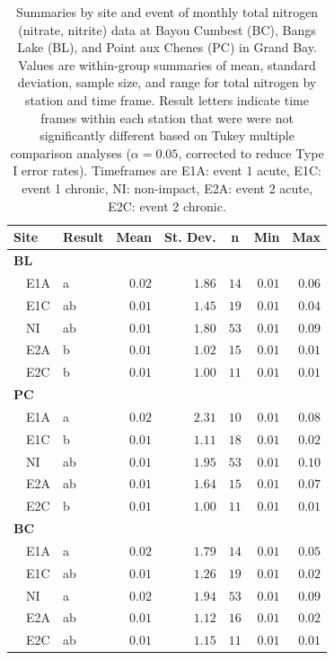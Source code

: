 \documentclass[letterpaper,12pt]{article}\usepackage[]{graphicx}\usepackage[]{color}
\begin{document}
\begin{table}[!tbp]
\caption{Summaries by site and event of monthly total nitrogen (nitrate, nitrite) data at Bayou Cumbest (BC), Bangs Lake (BL), and Point aux Chenes (PC) in Grand Bay.  Values are within-group summaries of mean, standard deviation, sample size, and range for total nitrogen by station and time frame.  Result letters indicate time frames within each station that were were not significantly different based on Tukey multiple comparison analyses ($\alpha = 0.05$, corrected to reduce Type I error rates). Timeframes are E1A: event 1 acute, E1C: event 1 chronic, NI: non-impact, E2A: event 2 acute, E2C: event 2 chronic.\label{tab:tntab}} 
\begin{center}
\begin{tabular}{llrrrrr}
\hline\hline
\multicolumn{1}{l}{Site}&\multicolumn{1}{c}{Result}&\multicolumn{1}{c}{Mean}&\multicolumn{1}{c}{St. Dev.}&\multicolumn{1}{c}{n}&\multicolumn{1}{c}{Min}&\multicolumn{1}{c}{Max}\tabularnewline
\hline
{\bfseries BL}&&&&&&\tabularnewline
~~E1A&a&$0.02$&$1.86$&$14$&$0.01$&$0.06$\tabularnewline
~~E1C&ab&$0.01$&$1.45$&$19$&$0.01$&$0.04$\tabularnewline
~~NI&ab&$0.01$&$1.80$&$53$&$0.01$&$0.09$\tabularnewline
~~E2A&b&$0.01$&$1.02$&$15$&$0.01$&$0.01$\tabularnewline
~~E2C&b&$0.01$&$1.00$&$11$&$0.01$&$0.01$\tabularnewline
\hline
{\bfseries PC}&&&&&&\tabularnewline
~~E1A&a&$0.02$&$2.31$&$10$&$0.01$&$0.08$\tabularnewline
~~E1C&b&$0.01$&$1.11$&$18$&$0.01$&$0.02$\tabularnewline
~~NI&ab&$0.01$&$1.95$&$53$&$0.01$&$0.10$\tabularnewline
~~E2A&ab&$0.01$&$1.64$&$15$&$0.01$&$0.07$\tabularnewline
~~E2C&b&$0.01$&$1.00$&$11$&$0.01$&$0.01$\tabularnewline
\hline
{\bfseries BC}&&&&&&\tabularnewline
~~E1A&a&$0.02$&$1.79$&$14$&$0.01$&$0.05$\tabularnewline
~~E1C&ab&$0.01$&$1.26$&$19$&$0.01$&$0.02$\tabularnewline
~~NI&a&$0.02$&$1.94$&$53$&$0.01$&$0.09$\tabularnewline
~~E2A&ab&$0.01$&$1.12$&$16$&$0.01$&$0.02$\tabularnewline
~~E2C&ab&$0.01$&$1.15$&$11$&$0.01$&$0.01$\tabularnewline
\hline
\end{tabular}\end{center}

\end{table}

\clearpage
\end{document}
